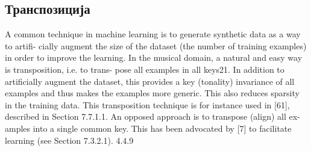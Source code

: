 \subsection{Транспозиција}

A common technique in machine learning is to generate synthetic data as a way to artifi- cially augment the size of the dataset (the number of training examples) in order to improve the learning. In the musical domain, a natural and easy way is transposition, i.e. to trans- pose all examples in all keys21. In addition to artificially augment the dataset, this provides a key (tonality) invariance of all examples and thus makes the examples more generic. This also reduces sparsity in the training data. This transposition technique is for instance used in [61], described in Section 7.7.1.1. An opposed approach is to transpose (align) all ex- amples into a single common key. This has been advocated by [7] to facilitate learning (see Section 7.3.2.1).
4.4.9

